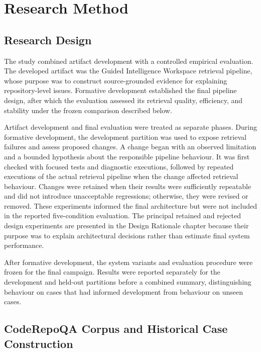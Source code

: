 \chapter{Research Method}\label{ch:research-method}

\section{Research Design}\label{sec:research-design}

The study combined artifact development with a controlled empirical evaluation. The developed artifact was the Guided Intelligence Workspace retrieval pipeline, whose purpose was to construct source-grounded evidence for explaining repository-level issues. Formative development established the final pipeline design, after which the evaluation assessed its retrieval quality, efficiency, and stability under the frozen comparison described below.

Artifact development and final evaluation were treated as separate phases. During formative development, the development partition was used to expose retrieval failures and assess proposed changes. A change began with an observed limitation and a bounded hypothesis about the responsible pipeline behaviour. It was first checked with focused tests and diagnostic executions, followed by repeated executions of the actual retrieval pipeline when the change affected retrieval behaviour. Changes were retained when their results were sufficiently repeatable and did not introduce unacceptable regressions; otherwise, they were revised or removed. These experiments informed the final architecture but were not included in the reported five-condition evaluation. The principal retained and rejected design experiments are presented in the Design Rationale chapter because their purpose was to explain architectural decisions rather than estimate final system performance.

After formative development, the system variants and evaluation procedure were frozen for the final campaign. Results were reported separately for the development and held-out partitions before a combined summary, distinguishing behaviour on cases that had informed development from behaviour on unseen cases.

\section{CodeRepoQA Corpus and Historical Case Construction}\label{sec:coderepoqa-corpus-and-historical-case-construction}

